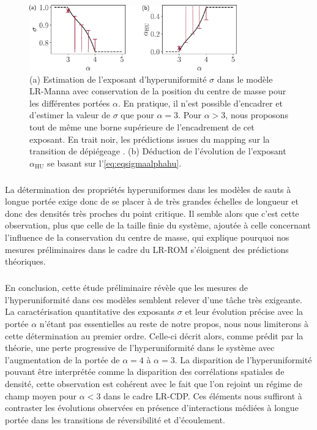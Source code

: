 \begin{figure}[h]
\centering
\includegraphics[width=0.8\textwidth]{Chapitre2/Figures/Hyperuniformity/eta_alpha_jumpsManna.pdf}
\caption{(a) Estimation de l'exposant d'hyperuniformité $\sigma$ dans le modèle LR-Manna avec conservation de la position du centre de masse pour les différentes portées $\alpha$. En pratique, il n'est possible d'encadrer et d'estimer la valeur de $\sigma$ que pour $\alpha=3$. Pour $\alpha>3$, nous proposons tout de même une borne supérieure de l'encadrement de cet exposant. En trait noir, les prédictions issues du mapping sur la transition de dépiégeage \cite{wiese_longrange}. (b) Déduction de l'évolution de l'exposant $\alpha_\text{HU}$ se basant sur l'\autoref{eq:eqsigmaalphahu}.}
\label{eq:HUMannaShlag}
\end{figure}

\subparagraph{}La détermination des propriétés hyperuniformes dans les modèles de sauts à longue portée exige donc de se placer à de très grandes échelles de longueur et donc des densités très proches du point critique. Il semble alors que c'est cette observation, plus que celle de la taille finie du système, ajoutée à celle concernant l'influence de la conservation du centre de masse, qui explique pourquoi nos mesures préliminaires dans le cadre du LR-ROM s'éloignent des prédictions théoriques. 

\subparagraph{}En conclusion, cette étude préliminaire révèle que les mesures de l'hyperuniformité dans ces modèles semblent relever d'une tâche très exigeante. La caractérisation quantitative des exposants $\sigma$ et leur évolution précise avec la portée $\alpha$ n'étant pas essentielles au reste de notre propos, nous nous limiterons à cette détermination au premier ordre. Celle-ci décrit alors, comme prédit par la théorie, une perte progressive de l'hyperuniformité dans le système avec l'augmentation de la portée de $\alpha=4$ à $\alpha=3$. La disparition de l'hyperuniformité pouvant être interprétée comme la disparition des corrélations spatiales de densité, cette observation est cohérent avec le fait que l'on rejoint un régime de champ moyen pour $\alpha <3$ dans le cadre LR-CDP. Ces éléments nous suffiront à contraster les évolutions observées en présence d'interactions médiées à longue portée dans les transitions de réversibilité et d'écoulement.


